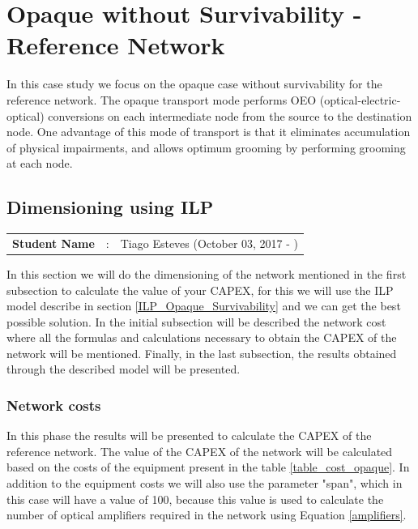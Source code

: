 \clearpage

\section{Opaque without Survivability - Reference Network} \label{Reference_Network}

In this case study we focus on the opaque case without survivability for the reference network.
The opaque transport mode performs OEO (optical-electric-optical) conversions on each intermediate node from the source to the destination node.
One advantage of this mode of transport is that it eliminates accumulation of physical impairments, and allows optimum grooming by performing grooming at each node.


\subsection{Dimensioning using ILP}
\begin{tcolorbox}	
\begin{tabular}{p{2.75cm} p{0.2cm} p{10.5cm}} 	
\textbf{Student Name}  &:& Tiago Esteves    (October 03, 2017 - )\\
\end{tabular}
\end{tcolorbox}

\vspace{11pt}
In this section we will do the dimensioning of the network mentioned in the first subsection to calculate the value of your CAPEX, for this we will use the ILP model describe in section \ref{ILP_Opaque_Survivability} and we can get the best possible solution.
In the initial subsection will be described the network cost where all the formulas and calculations necessary to obtain the CAPEX of the network will be mentioned.
Finally, in the last subsection, the results obtained through the described model will be presented.

\subsubsection{Network costs}\label{Net_Costs}

In this phase the results will be presented to calculate the CAPEX of the reference network.
The value of the CAPEX of the network will be calculated based on the costs of the equipment present in the table \ref{table_cost_opaque}.
In addition to the equipment costs we will also use the parameter "span", which in this case will have a value of 100, because this value is used to calculate the number of optical amplifiers required in the network using Equation \ref{amplifiers}.\\

